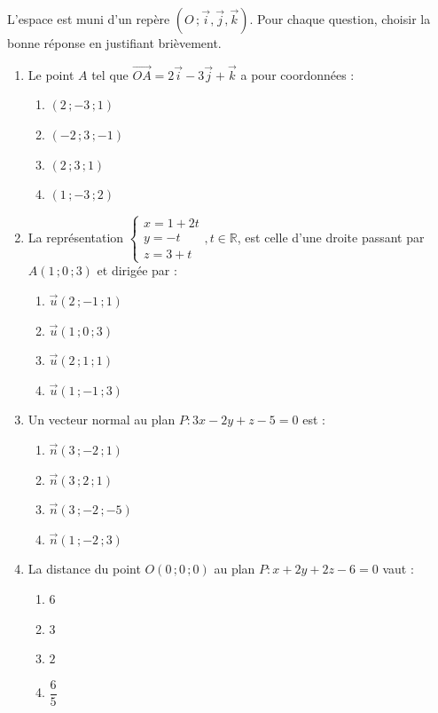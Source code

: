 \documentclass[11pt]{article}
\begin{document}
\begin{exercice}
L'espace est muni d'un repère $(O\,;\vec{i},\vec{j},\vec{k})$. Pour chaque question, choisir la bonne réponse en justifiant brièvement.
\begin{enumerate}
\item Le point $A$ tel que $\overrightarrow{OA} = 2\vec{i} - 3\vec{j} + \vec{k}$ a pour coordonnées :
\begin{enumerate}
\item $(2\,;-3\,;1)$ \quad \item $(-2\,;3\,;-1)$ \quad \item $(2\,;3\,;1)$ \quad \item $(1\,;-3\,;2)$
\end{enumerate}
\item La représentation $\begin{cases} x = 1 + 2t \\ y = -t \\ z = 3 + t \end{cases}, t \in \mathbb{R}$, est celle d'une droite passant par $A(1\,;0\,;3)$ et dirigée par :
\begin{enumerate}
\item $\vec{u}(2\,;-1\,;1)$ \quad \item $\vec{u}(1\,;0\,;3)$ \quad \item $\vec{u}(2\,;1\,;1)$ \quad \item $\vec{u}(1\,;-1\,;3)$
\end{enumerate}
\item Un vecteur normal au plan $P : 3x - 2y + z - 5 = 0$ est :
\begin{enumerate}
\item $\vec{n}(3\,;-2\,;1)$ \quad \item $\vec{n}(3\,;2\,;1)$ \quad \item $\vec{n}(3\,;-2\,;-5)$ \quad \item $\vec{n}(1\,;-2\,;3)$
\end{enumerate}
\item La distance du point $O(0\,;0\,;0)$ au plan $P : x + 2y + 2z - 6 = 0$ vaut :
\begin{enumerate}
\item $6$ \quad \item $3$ \quad \item $2$ \quad \item $\dfrac{6}{5}$
\end{enumerate}
\end{enumerate}
\end{exercice}
\end{document}
